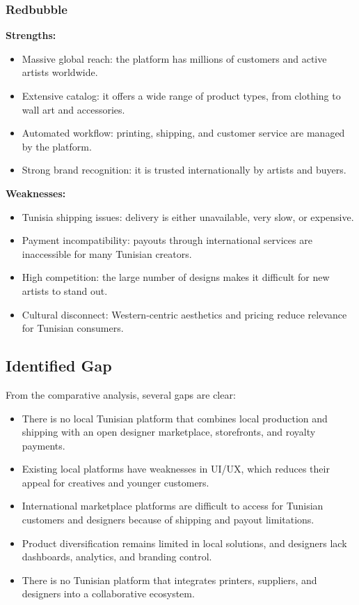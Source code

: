 \subsubsection{Redbubble}
\textbf{Strengths:}
\begin{itemize}
    \item Massive global reach: the platform has millions of customers and active artists worldwide.
    \item Extensive catalog: it offers a wide range of product types, from clothing to wall art and accessories.
    \item Automated workflow: printing, shipping, and customer service are managed by the platform.
    \item Strong brand recognition: it is trusted internationally by artists and buyers.
\end{itemize}

\textbf{Weaknesses:}
\begin{itemize}
    \item Tunisia shipping issues: delivery is either unavailable, very slow, or expensive.
    \item Payment incompatibility: payouts through international services are inaccessible for many Tunisian creators.
    \item High competition: the large number of designs makes it difficult for new artists to stand out.
    \item Cultural disconnect: Western-centric aesthetics and pricing reduce relevance for Tunisian consumers.
\end{itemize}

\subsection{Identified Gap}
From the comparative analysis, several gaps are clear:

\begin{itemize}
    \item There is no local Tunisian platform that combines local production and shipping with an open designer marketplace, storefronts, and royalty payments.
    \item Existing local platforms have weaknesses in UI/UX, which reduces their appeal for creatives and younger customers.
    \item International marketplace platforms are difficult to access for Tunisian customers and designers because of shipping and payout limitations.
    \item Product diversification remains limited in local solutions, and designers lack dashboards, analytics, and branding control.
    \item There is no Tunisian platform that integrates printers, suppliers, and designers into a collaborative ecosystem.
\end{itemize}

